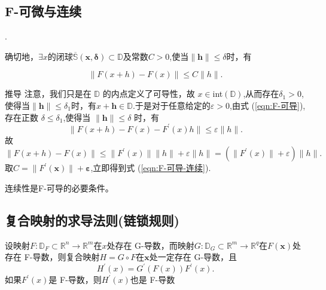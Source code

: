 \documentclass{lzureport}
\begin{document}
\subsection{F-可微与连续}
\colorbox{yellow}{}.

确切地，$\exists x$的闭球$\overline{\mathbb{S}}(\boldsymbol{x},\boldsymbol{\delta})\subset\mathbb{D}$及常数$C>0$,使当$\|\boldsymbol{h}\|\leqslant\delta$时，有

\begin{equation}
\|F(x+h)-F(x)\|\leqslant C\|h\|.
\end{equation}\label{eqn:F-可导-连续}

\begin{derivation}{推导}
	注意，我们只是在 $\mathbb{D}$ 的内点定义了可导性，故 $x\in$int$(\mathbb{D})$,从而存在$\delta_1>0$,使得当$\|\boldsymbol{h}\|\leqslant\delta_1$时，有$x+\boldsymbol{h}\in\mathbb{D}.$于是对于任意给定的$\varepsilon>0$,由式 (\ref{eqn:F-可导}),存在正数 $\delta\leqslant\delta_1$,使得当 $\|\boldsymbol{h}\|\leqslant\delta$ 时，有
	$$\|F(x+h)-F(x)-F^{\prime}(x)h\|\leqslant\varepsilon\|h\|.$$
	故
	$$\|F(x+h)-F(x)\|\leqslant\|F^{\prime}(x)\|\|h\|+\varepsilon\|h\|=(\|F^{\prime}(x)\|+\varepsilon)\|h\|.$$
	取$C= \| F^{\prime }( \boldsymbol{x}) \| + \boldsymbol{\varepsilon }$,立即得到式 (\ref{eqn:F-可导-连续}).	

	\textcolor{YBXPurple}{连续性}是F-可导的\textcolor{YBXPurple}{必要条件}。
\end{derivation}

\subsection{复合映射的求导法则(链锁规则)}
 设映射$F:\mathbb{D}_F\subset\mathbb{R}^n\to\mathbb{R}^m$在$x$处存在 G-导数，而映射$G:\mathbb{D}_G\subset\mathbb{R}^m\to\mathbb{R}^q$在$F(\boldsymbol{x})$处存在 F-导数，则复合映射$H=G\circ F$在$\boldsymbol{x}$处一定存在 G-导数，且
$$H^{\prime}(x)=G^{\prime}(F(x))F^{\prime}(x).$$
如果$F^\prime(x)$是 F-导数，则$H^\prime(x)$也是 F-导数
\end{document}
